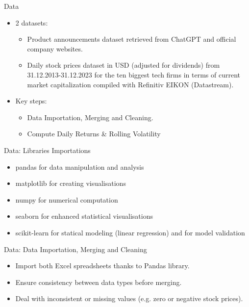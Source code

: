 \documentclass{beamer}
\begin{document}
\begin{frame}{Data}
  \begin{itemize}
    \item 2 datasets:
      \begin{itemize}
        \item Product announcements dataset retrieved from ChatGPT and official company websites.
        \item Daily stock prices dataset in USD (adjusted for dividends) from 31.12.2013-31.12.2023 for the ten biggest tech firms in terms of current market capitalization compiled with Refinitiv EIKON (Datastream).
      \end{itemize}
    \item Key steps:
      \begin{itemize}
        \item Data Importation, Merging and Cleaning.
        \item Compute Daily Returns \& Rolling Volatility
      \end{itemize}
  \end{itemize}
\end{frame}

\begin{frame}{Data: Libraries Importations}
\begin{itemize}
    \item pandas for data manipulation and analysis
    \item matplotlib for creating visualisations
    \item numpy for numerical computation
    \item seaborn for enhanced statistical visualisations
    \item scikit-learn for statical modeling (linear regression) and for model validation 
\end{itemize}
    
\end{frame}


\begin{frame}{Data: Data Importation, Merging and Cleaning}
  \begin{itemize}
      \item <1->Import both Excel spreadsheets thanks to Pandas library.
      \item <2->Ensure consistency between data types before merging.
      \item <3->Deal with inconsistent or missing values (e.g. zero or negative stock prices).
  \end{itemize}
    
\end{frame}
\end{document}
